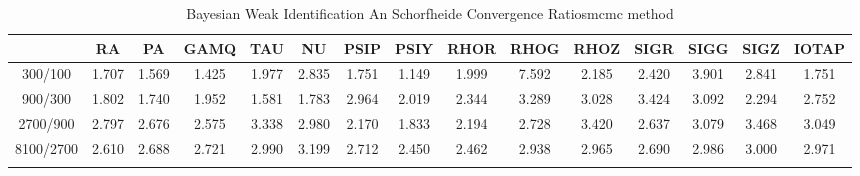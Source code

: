 \documentclass[a4paper,10pt]{article}
\begin{document}
\centering
\begin{longtable}{ccccccccccccccc}
\toprule
 & RA & PA & GAMQ & TAU & NU & PSIP & PSIY & RHOR & RHOG & RHOZ & SIGR & SIGG & SIGZ & IOTAP \\
\midrule
300/100 & 1.707 & 1.569 & 1.425 & 1.977 & 2.835 & 1.751 & 1.149 & 1.999 & 7.592 & 2.185 & 2.420 & 3.901 & 2.841 & 1.751 \\
900/300 & 1.802 & 1.740 & 1.952 & 1.581 & 1.783 & 2.964 & 2.019 & 2.344 & 3.289 & 3.028 & 3.424 & 3.092 & 2.294 & 2.752 \\
2700/900 & 2.797 & 2.676 & 2.575 & 3.338 & 2.980 & 2.170 & 1.833 & 2.194 & 2.728 & 3.420 & 2.637 & 3.079 & 3.468 & 3.049 \\
8100/2700 & 2.610 & 2.688 & 2.721 & 2.990 & 3.199 & 2.712 & 2.450 & 2.462 & 2.938 & 2.965 & 2.690 & 2.986 & 3.000 & 2.971 \\
\bottomrule
\caption{Bayesian Weak Identification An Schorfheide Convergence Ratiosmcmc method}
\label{table:tbl:WeakAnSchoConvergenceRatios_mcmc}
\end{longtable}
\end{document}
